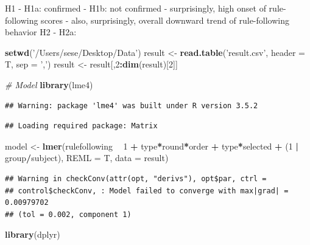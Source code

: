\documentclass[man]{apa6}
\newenvironment{Shaded}{\begin{snugshade}}{\end{snugshade}}
\newcommand{\CommentTok}[1]{\textcolor[rgb]{0.56,0.35,0.01}{\textit{#1}}}
\newcommand{\DataTypeTok}[1]{\textcolor[rgb]{0.13,0.29,0.53}{#1}}
\newcommand{\DecValTok}[1]{\textcolor[rgb]{0.00,0.00,0.81}{#1}}
\newcommand{\KeywordTok}[1]{\textcolor[rgb]{0.13,0.29,0.53}{\textbf{#1}}}
\newcommand{\NormalTok}[1]{#1}
\newcommand{\OperatorTok}[1]{\textcolor[rgb]{0.81,0.36,0.00}{\textbf{#1}}}
\newcommand{\StringTok}[1]{\textcolor[rgb]{0.31,0.60,0.02}{#1}}
\begin{document}
H1 - H1a: confirmed - H1b: not confirmed - surprisingly, high onset of
rule-following scores - also, surprisingly, overall downward trend of
rule-following behavior H2 - H2a:

\begin{Shaded}
\begin{Highlighting}[]
\KeywordTok{setwd}\NormalTok{(}\StringTok{'/Users/sese/Desktop/Data'}\NormalTok{)}
\NormalTok{result <-}\StringTok{ }\KeywordTok{read.table}\NormalTok{(}\StringTok{'result.csv'}\NormalTok{, }\DataTypeTok{header =}\NormalTok{ T, }\DataTypeTok{sep =} \StringTok{','}\NormalTok{)}
\NormalTok{result <-}\StringTok{ }\NormalTok{result[,}\DecValTok{2}\OperatorTok{:}\KeywordTok{dim}\NormalTok{(result)[}\DecValTok{2}\NormalTok{]]}

\CommentTok{# Model}
\KeywordTok{library}\NormalTok{(lme4)}
\end{Highlighting}
\end{Shaded}

\begin{verbatim}
## Warning: package 'lme4' was built under R version 3.5.2
\end{verbatim}

\begin{verbatim}
## Loading required package: Matrix
\end{verbatim}

\begin{Shaded}
\begin{Highlighting}[]
\NormalTok{model <-}\StringTok{ }\KeywordTok{lmer}\NormalTok{(rulefollowing }\OperatorTok{~}\StringTok{ }\DecValTok{1} \OperatorTok{+}\StringTok{ }\NormalTok{type}\OperatorTok{*}\NormalTok{round}\OperatorTok{*}\NormalTok{order }\OperatorTok{+}\StringTok{ }\NormalTok{type}\OperatorTok{*}\NormalTok{selected }\OperatorTok{+}\StringTok{ }\NormalTok{(}\DecValTok{1} \OperatorTok{|}\StringTok{ }\NormalTok{group}\OperatorTok{/}\NormalTok{subject),}
              \DataTypeTok{REML =}\NormalTok{ T,}
              \DataTypeTok{data =}\NormalTok{ result)}
\end{Highlighting}
\end{Shaded}

\begin{verbatim}
## Warning in checkConv(attr(opt, "derivs"), opt$par, ctrl =
## control$checkConv, : Model failed to converge with max|grad| = 0.00979702
## (tol = 0.002, component 1)
\end{verbatim}

\begin{Shaded}
\begin{Highlighting}[]
\KeywordTok{library}\NormalTok{(dplyr)}
\end{Highlighting}
\end{Shaded}
\end{document}

